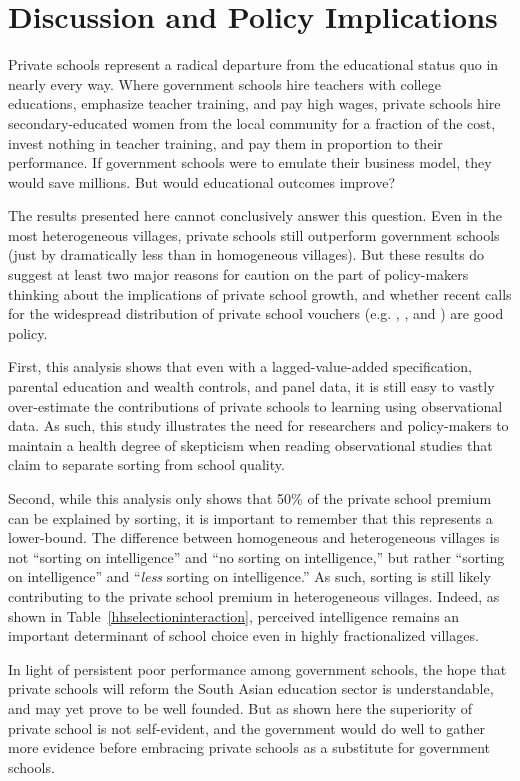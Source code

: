 \documentclass[Eubank_pk_ethnic_sorting.tex]{subfiles}
\begin{document}
\section{Discussion and Policy Implications}\label{conclusion}

Private schools represent a radical departure from the educational status quo in nearly every way. Where government schools hire teachers with college educations, emphasize teacher training, and pay high wages, private schools hire secondary-educated women from the local community for a fraction of the cost, invest nothing in teacher training, and pay them in proportion to their performance. If government schools were to emulate their business model, they would save millions. But would educational outcomes improve? 

The results presented here cannot conclusively answer this question. Even in the most heterogeneous villages, private schools still outperform government schools (just by dramatically less than in homogeneous villages). But these results do suggest at least two major reasons for caution on the part of policy-makers thinking about the implications of private school growth, and whether recent calls for the widespread distribution of private school vouchers (e.g. \cite{Chakrabarti:2008vc}, \cite{Kelkar:2006tq}, and \cite{Panagariya:2008wi}) are good policy.

First, this analysis shows that even with a lagged-value-added specification, parental education and wealth controls, and panel data, it is still easy to vastly over-estimate the contributions of private schools to learning using observational data. As such, this study illustrates the need for researchers and policy-makers to maintain a health degree of skepticism when reading observational studies that claim to separate sorting from school quality.

Second, while this analysis only shows that 50\% of the private school premium can be explained by sorting, it is important to remember that this represents a lower-bound. The difference between homogeneous and heterogeneous villages is not ``sorting on intelligence'' and ``no sorting on intelligence,'' but rather ``sorting on intelligence'' and ``\emph{less} sorting on intelligence.'' As such, sorting is still likely contributing to the private school premium in heterogeneous villages. Indeed, as shown in Table~\ref{hhselectioninteraction}, perceived intelligence remains an important determinant of school choice even in highly fractionalized villages. 

In light of persistent poor performance among government schools, the hope that private schools will reform the South Asian education sector is understandable, and may yet prove to be well founded. But as shown here the superiority of private school is not self-evident, and the government would do well to gather more evidence before embracing private schools as a substitute for government schools. 
\end{document}
